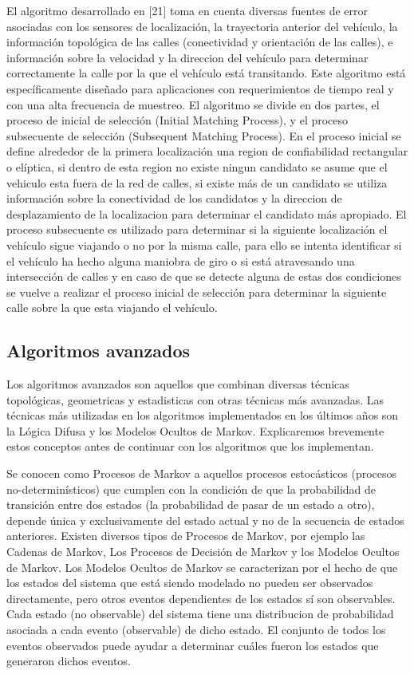 \documentclass[final,fmstyle]{fpunathesis}
\begin{document}
El algoritmo desarrollado en [21] toma en cuenta diversas fuentes de error asociadas con los sensores de localización, la trayectoria anterior del vehículo, la información topológica de las calles (conectividad y orientación de las calles), e información sobre la velocidad y la direccion del vehículo para determinar correctamente la calle por la que el vehículo está transitando. Este algoritmo está específicamente diseñado para aplicaciones con requerimientos de tiempo real y con una alta frecuencia de muestreo. El algoritmo se divide en dos partes, el proceso de inicial de selección (Initial Matching Process), y el proceso subsecuente de selección (Subsequent Matching Process). En el proceso inicial se define alrededor de la primera localización una region de confiabilidad rectangular o elíptica, si dentro de esta region no existe ningun candidato se asume que el vehiculo esta fuera de la red de calles, si existe más de un candidato se utiliza información sobre la conectividad de los candidatos y la direccion de desplazamiento de la localizacion para determinar el candidato más apropiado. El proceso subsecuente es utilizado para determinar si la siguiente localización el vehículo sigue viajando o no por la misma calle, para ello se intenta identificar si el vehículo ha hecho alguna maniobra de giro o si está atravesando una intersección de calles y en caso de que se detecte alguna de estas dos condiciones se vuelve a realizar el proceso inicial de selección para determinar la siguiente calle sobre la que esta viajando el vehículo.

\subsection{Algoritmos avanzados}

Los algoritmos avanzados son aquellos que combinan diversas técnicas topológicas, geometricas y estadisticas con otras técnicas más avanzadas. Las técnicas más utilizadas en los algoritmos implementados en los últimos años son la Lógica Difusa y los Modelos Ocultos de Markov. Explicaremos brevemente estos conceptos antes de continuar con los algoritmos que los implementan.

Se conocen como Procesos de Markov a aquellos procesos estocásticos (procesos no-determinísticos) que cumplen con la condición de que la probabilidad de transición entre dos estados (la probabilidad de pasar de un estado a otro), depende única y exclusivamente del estado actual y no de la secuencia de estados anteriores. Existen diversos tipos de Procesos de Markov, por ejemplo las Cadenas de Markov, Los Procesos de Decisión de Markov y los Modelos Ocultos de Markov. Los Modelos Ocultos de Markov se caracterizan por el hecho de que los estados del sistema  que está siendo modelado no pueden ser observados directamente, pero otros eventos dependientes de los estados sí son observables. Cada estado (no observable) del sistema tiene una distribucion de probabilidad asociada a cada evento (observable) de dicho estado. El conjunto de todos los eventos observados puede ayudar a determinar cuáles fueron los estados que generaron dichos eventos.
\end{document}
